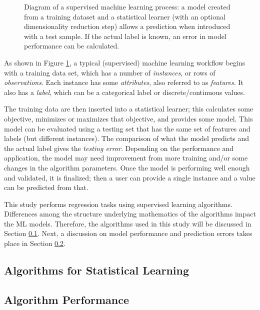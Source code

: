 \begin{figure}[!htb]
  \caption{Diagram of a supervised machine learning process: a model 
           created from a training dataset and a statistical learner (with
           an optional dimensionality reduction step) allows a prediction
           when introduced with a test sample. If the actual label is known,
           an error in model performance can be calculated.}
  \label{fig:supervised}
\end{figure}

As shown in Figure \ref{fig:supervised}, a typical (supervised) machine
learning workflow begins with a training data set, which has a number of
\textit{instances}, or rows of \textit{observations}.  Each instance has some
\textit{attributes}, also referred to as \textit{features}. It also has a
\textit{label}, which can be a categorical label or discrete/continuous values.  

The training data are then inserted into a statistical learner; this calculates
some objective, minimizes or maximizes that objective, and provides some model.
This model can be evaluated using a testing set that has the same set of
features and labels (but different instances). The comparison of what the
model predicts and the actual label gives the \textit{testing error}.
Depending on the performance and application, the model may need improvement
from more training and/or some changes in the algorithm parameters. Once the
model is performing well enough and validated, it is finalized; then a user can
provide a single instance and a value can be predicted from that. 

This study performs regression tasks using supervised learning algorithms.
Differences among the structure underlying mathematics of the algorithms impact the
\gls{ML} models.  Therefore, the algorithms used in this study will be discussed
in Section \ref{sec:algs}. Next, a discussion on model performance and prediction 
errors takes place in Section \ref{sec:errs}.

\subsection{Algorithms for Statistical Learning}
\label{sec:algs}


\subsection{Algorithm Performance}
\label{sec:errs}


